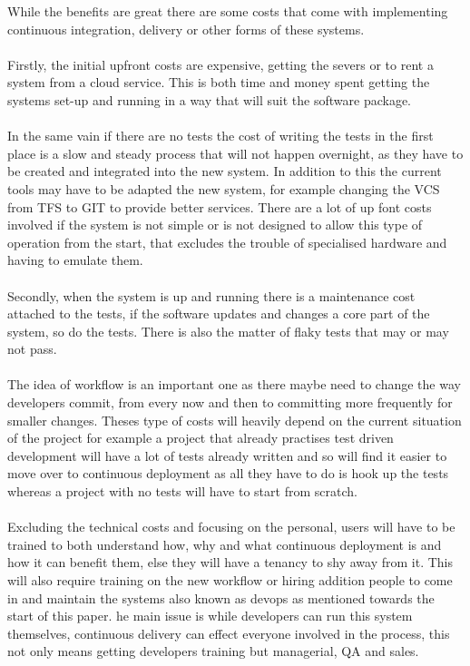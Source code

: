 While the benefits are great there are some costs that come with implementing continuous integration, delivery or other forms of these systems.
\\\\
Firstly, the initial upfront costs are expensive, getting the severs or to rent a system from a cloud service. This is both time and money spent getting the systems set-up and running in a way that will suit the software package. 
\\\\
In the same vain if there are no tests the cost of writing the tests in the first place is a slow and steady process that will not happen overnight, as they have to be created and integrated into the new system. In addition to this the current tools may have to be adapted the new system, for example changing the VCS from TFS to GIT to provide better services. There are a lot of up font costs involved if the system is not simple or is not designed to allow this type of operation from the start, that excludes the trouble of specialised hardware and having to emulate them. 
\\\\
Secondly, when the system is up and running there is a maintenance cost attached to the tests, if the software updates and changes a core part of the system, so do the tests. There is also the matter of flaky tests that may or may not pass.
\\\\
The idea of workflow is an important one as there maybe need to change the way developers commit, from every now and then to committing more frequently for smaller changes. Theses type of costs will heavily depend on the current situation of the project for example a project that already practises test driven development will have a lot of tests already written and so will find it easier to move over to continuous deployment as all they have to do is hook up the tests whereas a project with no tests will have to start from scratch. 
\\\\
Excluding the technical costs and focusing on the personal, users will have to be trained to both understand how, why and what continuous deployment is and how it can benefit them, else they will have a tenancy to shy away from it. This will also require training on the new workflow or hiring addition people to come in and maintain the systems also known as devops as mentioned towards the start of this paper. he main issue is while developers can run this system themselves, continuous delivery can effect everyone involved in the process, this not only means getting developers training but managerial, QA and sales. 

